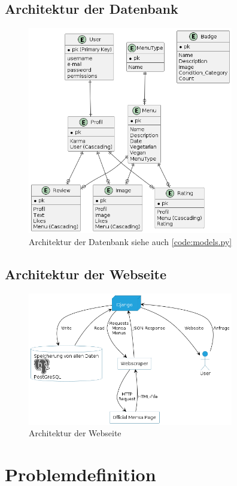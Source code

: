 \subsection{Architektur der Datenbank}
\begin{figure}[ht]
    \centering
    \includegraphics[width=0.8\textwidth]{images/Database.png}
    \caption{Architektur der Datenbank siehe auch \ref{code:models.py}}
    \label{fig:DB}
\end{figure}

\subsection{Architektur der Webseite}
\begin{figure}[ht]
    \centering
    \includegraphics[width=0.8\textwidth]{images/Webseite.png}
    \caption{Architektur der Webseite}
    \label{fig:Website}
\end{figure}

\section{Problemdefinition}\label{sec:problemdefinition}
